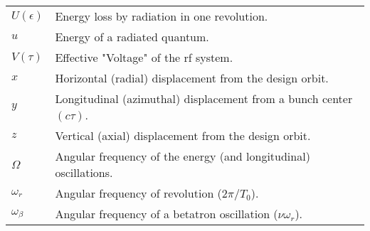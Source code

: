 \begin{tabularx}{\linewidth}{@{}lX@{}}
	$U(\epsilon)$ & Energy loss by radiation in one revolution.\\
	$u$			& Energy of a radiated quantum.\\
	$V(\tau)$	& Effective "Voltage" of the rf system.\\
	$x$			& Horizontal (radial) displacement from the design orbit.\\
	$y$			& Longitudinal (azimuthal) displacement from a bunch center $(c\tau)$.\\
    $z$			& Vertical (axial) displacement from the design orbit.\\
    $\Omega$	& Angular frequency of the energy (and longitudinal) oscillations.\\
    $\omega_r$	& Angular frequency of revolution ($2\pi/T_0$).\\
	$\omega_\beta$ & Angular frequency of a betatron oscillation ($\nu\omega_r$).    
\end{tabularx}